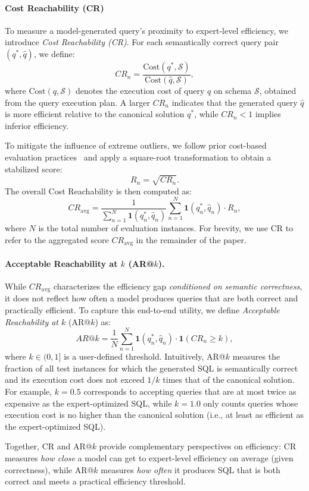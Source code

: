 \paragraph{\textbf{Cost Reachability (CR)}}
To measure a model-generated query's proximity to expert-level efficiency,
we introduce \emph{Cost Reachability (CR)}.
For each semantically correct query pair $(q^*, \hat{q})$, we define:
\[
CR_n = \frac{\text{Cost}(q^*, \mathcal{S})}{\text{Cost}(\hat{q}, \mathcal{S})},
\]
where $\text{Cost}(q, \mathcal{S})$ denotes the execution cost of query $q$ on schema $\mathcal{S}$, 
obtained from the query execution plan.
A larger $CR_n$ indicates that the generated query $\hat{q}$ is more efficient relative to the canonical solution $q^*$, 
while $CR_n < 1$ implies inferior efficiency.

To mitigate the influence of extreme outliers, we follow prior cost-based evaluation practices~\cite{li2023can} and apply a square-root transformation to obtain a stabilized score:
\[
R_n = \sqrt{CR_n}.
\]
The overall Cost Reachability is then computed as:
\[
CR_{\text{avg}} =
\frac{1}{\sum_{n=1}^{N} \mathbf{1}(q^*_n, \hat{q}_n)}
\sum_{n=1}^{N} \mathbf{1}(q^*_n, \hat{q}_n) \cdot R_n,
\]
where $N$ is the total number of evaluation instances. For brevity, we use CR to refer to the aggregated score $CR_{\text{avg}}$ in the remainder of the paper.

\paragraph{\textbf{Acceptable Reachability at $k$ (AR@$k$).}}
While $CR_{\text{avg}}$ characterizes the efficiency gap \emph{conditioned on semantic correctness}, it does not reflect how often a model produces queries that are both correct and practically efficient.
To capture this end-to-end utility, we define \emph{Acceptable Reachability at $k$} (AR@$k$) as:
\[
AR@k =
\frac{1}{N}
\sum_{n=1}^{N} \mathbf{1}(q^*_n, \hat{q}_n) \cdot \mathbf{1}(CR_n \ge k),
\]
where $k \in (0,1]$ is a user-defined threshold.
Intuitively, AR@$k$ measures the fraction of all test instances for which the generated SQL is semantically correct and its execution cost does not exceed $1/k$ times that of the canonical solution.
For example, $k=0.5$ corresponds to accepting queries that are at most twice as expensive as the expert-optimized SQL, while $k=1.0$ only counts queries whose execution cost is no higher than the canonical solution (i.e., at least as efficient as the expert-optimized SQL).

Together, CR and AR@$k$ provide complementary perspectives on efficiency:
CR measures \emph{how close} a model can get to expert-level efficiency on average (given correctness),
while AR@$k$ measures \emph{how often} it produces SQL that is both correct and meets a practical efficiency threshold.

